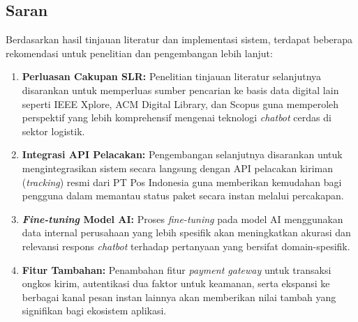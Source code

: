 \subsection{Saran}

Berdasarkan hasil tinjauan literatur dan implementasi sistem, terdapat beberapa rekomendasi untuk penelitian dan pengembangan lebih lanjut:

\begin{enumerate}[leftmargin=*]
    \item \textbf{Perluasan Cakupan SLR:} Penelitian tinjauan literatur selanjutnya disarankan untuk memperluas sumber pencarian ke basis data digital lain seperti IEEE Xplore, ACM Digital Library, dan Scopus guna memperoleh perspektif yang lebih komprehensif mengenai teknologi \textit{chatbot} cerdas di sektor logistik.

    \item \textbf{Integrasi API Pelacakan:} Pengembangan selanjutnya disarankan untuk mengintegrasikan sistem secara langsung dengan API pelacakan kiriman (\textit{tracking}) resmi dari PT Pos Indonesia guna memberikan kemudahan bagi pengguna dalam memantau status paket secara instan melalui percakapan.

    \item \textbf{\textit{Fine-tuning} Model AI:} Proses \textit{fine-tuning} pada model AI menggunakan data internal perusahaan yang lebih spesifik akan meningkatkan akurasi dan relevansi respons \textit{chatbot} terhadap pertanyaan yang bersifat domain-spesifik.

    \item \textbf{Fitur Tambahan:} Penambahan fitur \textit{payment gateway} untuk transaksi ongkos kirim, autentikasi dua faktor untuk keamanan, serta ekspansi ke berbagai kanal pesan instan lainnya akan memberikan nilai tambah yang signifikan bagi ekosistem aplikasi.
\end{enumerate}
